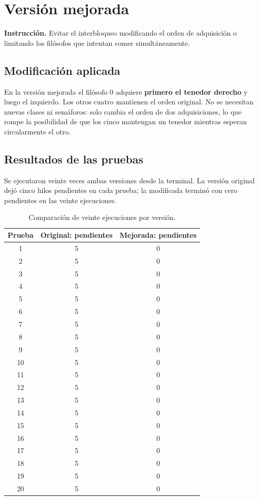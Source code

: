 \documentclass[12pt,oneside]{book}
\begin{document}
\chapter{Versión mejorada}
\textbf{Instrucción.} Evitar el interbloqueo modificando el orden de adquisición o limitando los filósofos que intentan comer simultáneamente.

\section{Modificación aplicada}
En la versión mejorada el filósofo 0 adquiere \textbf{primero el tenedor derecho} y luego el izquierdo. Los otros cuatro mantienen el orden original. No se necesitan nuevas clases ni semáforos: solo cambia el orden de dos adquisiciones, lo que rompe la posibilidad de que los cinco mantengan un tenedor mientras esperan circularmente el otro.

\section{Resultados de las pruebas}
Se ejecutaron veinte veces ambas versiones desde la terminal. La versión original dejó cinco hilos pendientes en cada prueba; la modificada terminó con cero pendientes en las veinte ejecuciones.
\begin{table}[H]\centering\caption{Comparación de veinte ejecuciones por versión.}
\begin{tabular}{ccc}\toprule
Prueba & Original: pendientes & Mejorada: pendientes\\\midrule
1&5&0\\2&5&0\\3&5&0\\4&5&0\\5&5&0\\
6&5&0\\7&5&0\\8&5&0\\9&5&0\\10&5&0\\
11&5&0\\12&5&0\\13&5&0\\14&5&0\\15&5&0\\
16&5&0\\17&5&0\\18&5&0\\19&5&0\\20&5&0\\\bottomrule
\end{tabular}\end{table}
\end{document}
